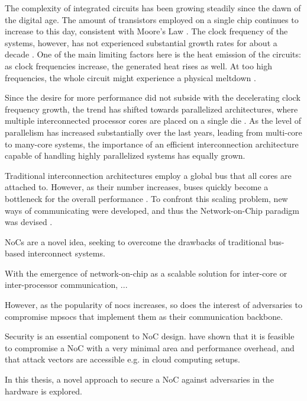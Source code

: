 The complexity of integrated circuits has been growing steadily since the dawn of the digital age. The amount of transistors employed on a single chip
continues to increase to this day, consistent with Moore's Law \cite{mack11mooreslaw}. The clock frequency of the systems, however, has not
experienced substantial growth rates for about a decade \cite{intelfrequency}. One of the main limiting factors here is the heat emission of the
circuits: as clock frequencies increase, the generated heat rises as well. At too high frequencies, the whole circuit might experience a physical
meltdown \cite{intelfrequency}.

Since the desire for more performance did not subside with the decelerating clock frequency growth, the trend has shifted towards parallelized
architectures, where multiple interconnected processor cores are placed on a single die \cite[6]{kumar08parallel}. As the level of parallelism has
increased substantially over the last years, leading from multi-core to many-core systems, the importance of an efficient interconnection architecture
capable of handling highly parallelized systems has equally grown.

Traditional interconnection architectures employ a global bus that all cores are attached to. However, as their number increases, buses quickly become
a bottleneck for the overall performance \cite[6]{tatas16designingnocs}. To confront this scaling problem, new ways of communicating were developed,
and thus the Network-on-Chip paradigm was devised \cites{kumar02networkonchip}{benini02nocparadigm}.

NoCs are a novel idea, seeking to overcome the drawbacks of traditional bus-based interconnect systems.

With the emergence of network-on-chip as a scalable solution for inter-core or inter-processor communication, ...

However, as the popularity of \glspl{noc} increases, so does the interest of adversaries to compromise \glspl{mpsoc} that implement them as their communication
backbone.

Security is an essential component to NoC design. \citeauthor{ancajas14fortnocs} have shown that it is feasible to compromise a NoC with a very
minimal area and performance overhead, and that attack vectors are accessible e.g. in cloud computing setups. \cite{ancajas14fortnocs}

In this thesis, a novel approach to secure a NoC against adversaries in the hardware is explored.

